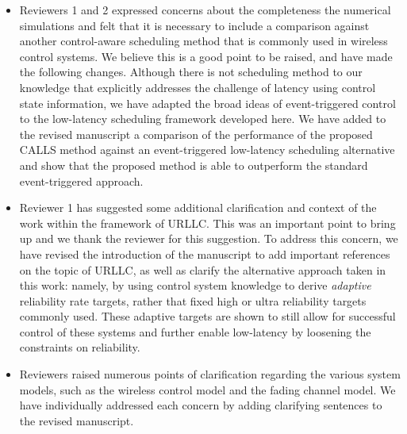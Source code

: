 \documentclass[11pt]{article}
\begin{document}
\begin{itemize}

\item[{\bf[C1]}] Reviewers 1 and 2 expressed concerns about the completeness the numerical simulations and felt that it is necessary to include a comparison against another control-aware scheduling method that is commonly used in wireless control systems. We believe this is a good point to be raised, and have made the following changes. Although there is not scheduling method to our knowledge that explicitly addresses the challenge of latency using control state information, we have adapted the broad ideas of event-triggered control to the low-latency scheduling framework developed here. We have added to the revised manuscript a comparison of the performance of the proposed CALLS method against an event-triggered low-latency scheduling alternative and show that the proposed method is able to outperform the standard event-triggered approach.


\item[{\bf[C2]}] Reviewer 1 has suggested some additional clarification and context of the work within the framework of URLLC. This was an important point to bring up and we thank the reviewer for this suggestion. To address this concern, we have revised the introduction of the manuscript to add important references on the topic of URLLC, as well as clarify the alternative approach taken in this work: namely, by using control system knowledge to derive \emph{adaptive} reliability rate targets, rather that fixed high or ultra reliability targets commonly used. These adaptive targets are shown to still allow for successful control of these systems and further enable low-latency by loosening the constraints on reliability.


\item[{\bf[C3]}] Reviewers raised numerous points of clarification regarding the various system models, such as the wireless control model and the fading channel model. We have individually addressed each concern by adding clarifying sentences to the revised manuscript.


\end{itemize}



\reviewer
\end{document}
